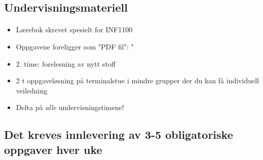 \documentclass[%
oneside,                 %
final,                   %
10pt]{article}
\begin{document}
\noindent



\subsection*{Undervisningsmateriell}


\paragraph{}
\begin{itemize}
  \item Lærebok skrevet spesielt for INF1100

  \item Oppgavene foreligger som "PDF fil": "

  \item 2. time: forelesning av nytt stoff

  \item 2 t oppgaveløsning på terminalstue i mindre grupper der du kan få individuell veiledning

  \item Delta på \emph{alle} undervisningstimene!
\end{itemize}

\noindent




\subsection*{Det kreves innlevering av 3-5 obligatoriske oppgaver hver uke}


\end{document}
